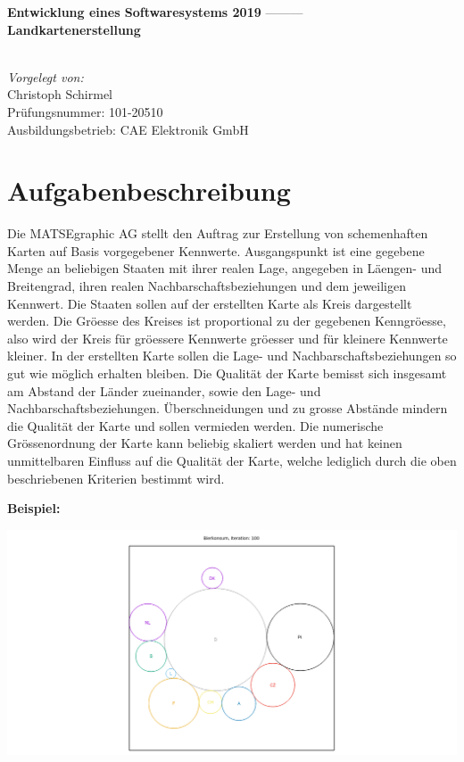 \documentclass[a4paper,11pt]{article}
\begin{document}
\begin{titlepage}
	\hfill
	\vfill
	{
	\begin{center}
	\huge{\textbf{Entwicklung eines Softwaresystems 2019}}
	---------\\
	\large{\textbf{Landkartenerstellung}}
	\end{center}
	}

	\vfill
{\textit{\\Vorgelegt von:\\}}
	{Christoph Schirmel\\}
	{Pr\"ufungsnummer: }
	{101-20510\\}
	{Ausbildungsbetrieb: }
	{CAE Elektronik GmbH}
\end{titlepage}
\tableofcontents
\newpage

{\parindent0pt
\section{Aufgabenbeschreibung}
Die MATSEgraphic AG stellt den Auftrag zur Erstellung von schemenhaften Karten auf Basis vorgegebener Kennwerte. Ausgangspunkt ist eine gegebene Menge an beliebigen Staaten mit
ihrer realen Lage, angegeben in L\"aengen- und Breitengrad, ihren realen Nachbarschaftsbeziehungen und dem jeweiligen Kennwert. Die Staaten sollen auf der erstellten Karte als Kreis
dargestellt werden. Die Gr\"oesse des Kreises ist proportional zu der gegebenen Kenngr\"oesse, also wird der Kreis f\"ur gr\"oessere Kennwerte gr\"oesser und f\"ur kleinere Kennwerte kleiner.
In der erstellten Karte sollen die Lage- und Nachbarschaftsbeziehungen so gut wie m\"oglich erhalten bleiben. Die Qualit\"at der Karte bemisst sich insgesamt am Abstand der L\"ander zueinander, sowie den Lage-
und Nachbarschaftsbeziehungen. \"Uberschneidungen und zu grosse Abst\"ande mindern die Qualit\"at der Karte und sollen vermieden werden. Die numerische Gr\"ossenordnung der Karte kann beliebig skaliert werden und hat keinen 
unmittelbaren Einfluss auf die Qualit\"at der Karte, welche lediglich durch die oben beschriebenen Kriterien bestimmt wird.

\vspace{10mm}
\textbf{Beispiel:}

\begin{center}
\includegraphics[width=\linewidth]{ihk_beispiel2.png}
\end{center}

}
\end{document}
